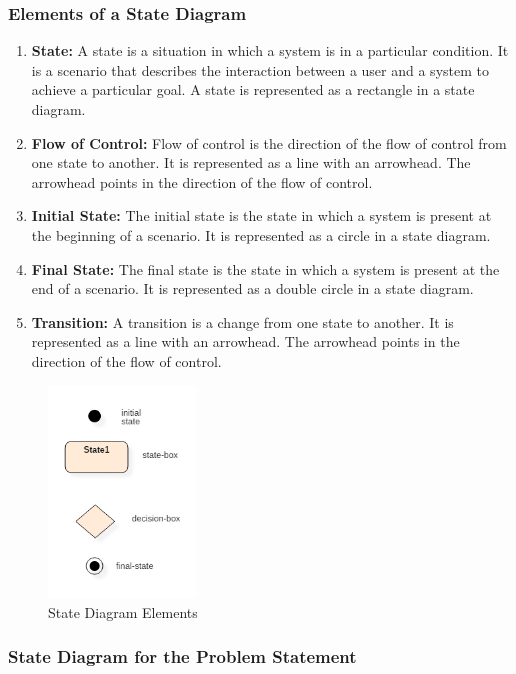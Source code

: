 \documentclass[11pt]{article}
\begin{document}
\subsubsection{Elements of a State Diagram}

\begin{enumerate}
	\item \textbf{State:} A state is a situation in which a system is in a particular condition. It is a scenario that describes the interaction between a user and a system to achieve a particular goal. A state is represented as a rectangle in a state diagram.
	\item \textbf{Flow of Control:} Flow of control is the direction of the flow of control from one state to another. It is represented as a line with an arrowhead. The arrowhead points in the direction of the flow of control.
	\item \textbf{Initial State:} The initial state is the state in which a system is present at the beginning of a scenario. It is represented as a circle in a state diagram.
	\item \textbf{Final State:} The final state is the state in which a system is present at the end of a scenario. It is represented as a double circle in a state diagram.
	\item \textbf{Transition:} A transition is a change from one state to another. It is represented as a line with an arrowhead. The arrowhead points in the direction of the flow of control.
\end{enumerate}

\begin{figure}[H]
	\centering
	\includegraphics[width=0.35\textwidth]{052919_0832_StateMachin1.png}
	\caption{State Diagram Elements}
	\label{fig:state_diagram}
\end{figure}

\subsubsection{State Diagram for the Problem Statement}
\end{document}
